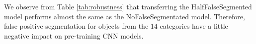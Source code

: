 We observe from Table \ref{tab:robustness} that transferring the HalfFalseSegmented model performs almost the same as the NoFalseSegmentated model.
Therefore, false positive segmentation for objects from the 14 categories have a little negative impact on pre-training CNN models.

\begin{table}[t]
\end{table}
